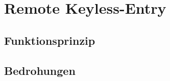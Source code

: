 \chapter{\foreignlanguage{english}{Remote Keyless-Entry}}

\section{Funktionsprinzip}

\section{Bedrohungen}
